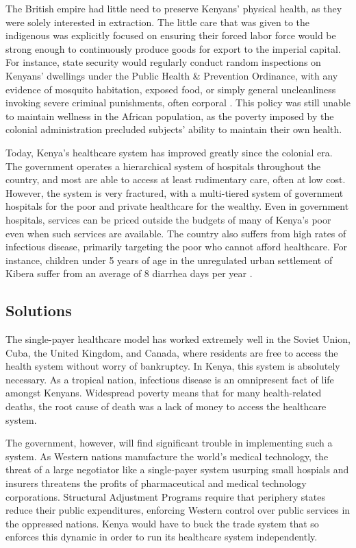 \documentclass[american]{../../../coursework}
\begin{document}
The British empire had little need to preserve Kenyans' physical health, as
they were solely interested in extraction. The little care that was given to
the indigenous was explicitly focused on ensuring their forced labor force
would be strong enough to continuously produce goods for export to the
imperial capital. For instance, state security would regularly conduct random
inspections on Kenyans' dwellings under the Public Health \& Prevention
Ordinance, with any evidence of mosquito habitation, exposed food, or simply
general uncleanliness invoking severe criminal punishments, often corporal
\parencite{Achola2010}. This policy was still unable to maintain wellness in
the African population, as the poverty imposed by the colonial administration
precluded subjects' ability to maintain their own health.

Today, Kenya's healthcare system has improved greatly since the colonial era.
The government operates a hierarchical system of hospitals throughout the
country, and most are able to access at least rudimentary care, often at low
cost. However, the system is very fractured, with a multi-tiered system of
government hospitals for the poor and private healthcare for the wealthy. Even
in government hospitals, services can be priced outside the budgets of many of
Kenya's poor even when such services are available. The country also suffers
from high rates of infectious disease, primarily targeting the poor who cannot
afford healthcare. For instance, children under 5 years of age in the
unregulated urban settlement of Kibera suffer from an average of 8 diarrhea
days per year \parencite{Feikin2011}.

\subsection{Solutions}

The single-payer healthcare model has worked extremely well in the Soviet
Union, Cuba, the United Kingdom, and Canada, where residents are free to
access the health system without worry of bankruptcy. In Kenya, this system is
absolutely necessary. As a tropical nation, infectious disease is an
omnipresent fact of life amongst Kenyans. Widespread poverty means that for
many health-related deaths, the root cause of death was a lack of money to
access the healthcare system.

The government, however, will find significant trouble in implementing such a
system. As Western nations manufacture the world's medical technology, the
threat of a large negotiator like a single-payer system usurping small
hospials and insurers threatens the profits of pharmaceutical and medical
technology corporations. Structural Adjustment Programs require that periphery
states reduce their public expenditures, enforcing Western control over public
services in the oppressed nations. Kenya would have to buck the trade system
that so enforces this dynamic in order to run its healthcare system
independently.
\end{document}
